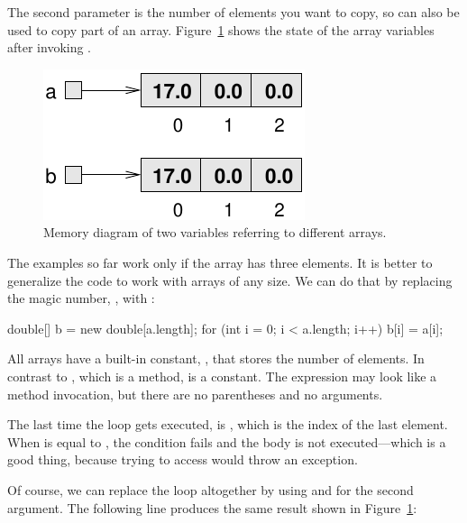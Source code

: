 The second parameter is the number of elements you want to copy, so  can also be used to copy part of an array.
Figure~\ref{fig.array4} shows the state of the array variables after invoking .

\begin{figure}[!ht]
\begin{center}
\includegraphics{figs/array4.pdf}
\caption{Memory diagram of two variables referring to different arrays.}
\label{fig.array4}
\end{center}
\end{figure}




The examples so far work only if the array has three elements.
It is better to generalize the code to work with arrays of any size.
We can do that by replacing the magic number, , with :

\begin{code}
double[] b = new double[a.length];
for (int i = 0; i < a.length; i++) {
    b[i] = a[i];
}
\end{code}

All arrays have a built-in constant, , that stores the number of elements.
In contrast to , which is a method,  is a constant.
The expression  may look like a method invocation, but there are no parentheses and no arguments.

The last time the loop gets executed,  is , which is the index of the last element.
When  is equal to , the condition fails and the body is not executed---which is a good thing, because trying to access  would throw an exception.

Of course, we can replace the loop altogether by using  and  for the second argument.
The following line produces the same result shown in Figure~\ref{fig.array4}:

